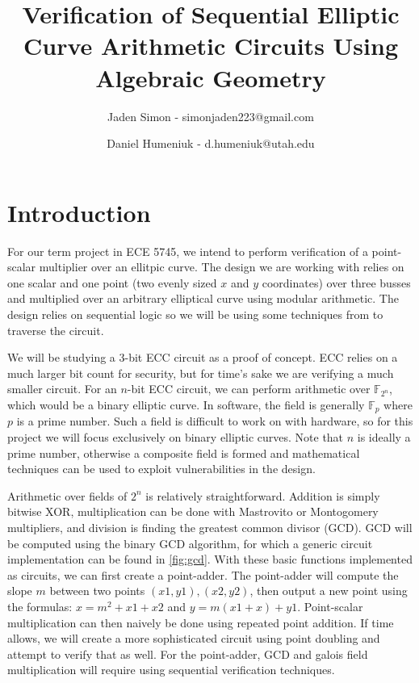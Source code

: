 \documentclass[12pt]{report}
\title{Verification of Sequential Elliptic Curve Arithmetic Circuits Using Algebraic Geometry}
\author{Jaden Simon - simonjaden223@gmail.com \\ \and
	   Daniel Humeniuk - d.humeniuk@utah.edu}
\begin{document}
\maketitle

\section{Introduction}

For our term project in ECE 5745, we intend to perform verification of a point-scalar multiplier over an ellitpic curve. The design we are working with relies on  one scalar and one point (two evenly sized $x$ and $y$ coordinates) over three busses and multiplied over an arbitrary elliptical curve using modular arithmetic. The design relies on sequential logic so we will be using some techniques from \cite{Kalla} to traverse the circuit.

We will be studying a 3-bit ECC circuit as a proof of concept. ECC relies on a much larger bit count for security, but for time's sake we are verifying a much smaller circuit. For an $n$-bit ECC circuit, we can perform arithmetic over $\mathbb{F}_{2^n}$, which would be a binary elliptic curve. In software, the field is generally $\mathbb{F}_{p}$ where $p$ is a prime number. Such a field is difficult to work on with hardware, so for this project we will focus exclusively on binary elliptic curves. Note that $n$ is ideally a prime number, otherwise a composite field is formed and mathematical techniques can be used to exploit vulnerabilities in the design. 

Arithmetic over fields of $2^n$ is relatively straightforward. Addition is simply bitwise XOR, multiplication can be done with Mastrovito or Montogomery multipliers, and division is finding the greatest common divisor (GCD). GCD will be computed using the binary GCD algorithm, for which a generic circuit implementation can be found in \ref{fig:gcd}. With these basic functions implemented as circuits, we can first create a point-adder. The point-adder will compute the slope $m$ between two points $(x1, y1), (x2, y2)$, then output a new point using the formulas: $x = m^2 + x1 + x2$ and $y = m(x1 + x) + y1$. Point-scalar multiplication can then naively be done using repeated point addition. If time allows, we will create a more sophisticated circuit using point doubling and attempt to verify that as well. For the point-adder, GCD and galois field multiplication will require using sequential verification techniques. 
\end{document}
